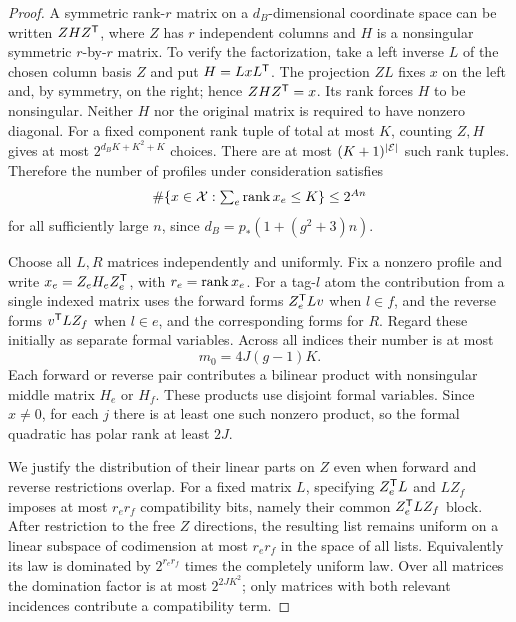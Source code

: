 \begin{proof}
A symmetric rank-$r$ matrix on a $d_B$-dimensional coordinate
space can be written $ZHZ^{\mathsf T}$, where $Z$ has $r$ independent
columns and $H$ is a nonsingular symmetric $r$-by-$r$ matrix.
To verify the factorization, take a left inverse $L$ of the
chosen column basis $Z$ and put $H=LxL^{\mathsf T}$.  The projection
$ZL$ fixes $x$ on the left and, by symmetry, on the right;
hence $ZHZ^{\mathsf T}=x$.  Its rank forces $H$ to be nonsingular.
Neither $H$ nor the original matrix is required to have nonzero
diagonal.  For a fixed component rank tuple of total at most
$K$, counting $Z,H$ gives at most $2^{d_BK+K^2+K}$ choices.
There are at most $(K+1)^{|\mathcal E|}$ such rank tuples.  Therefore
the number of profiles under consideration satisfies
\begin{equation}\label{eq:low-rank-profile-count}
 \#\{x\in\mathcal X:\textstyle\sum_e\operatorname{rank} x_e\le K\}\le2^{An}
\end{equation}
for all sufficiently large $n$, since
$d_B=p_*(1+(g^2+3)n)$.

Choose all $L,R$ matrices independently and uniformly.  Fix a
nonzero profile and write $x_e=Z_eH_eZ_e^{\mathsf T}$, with
$r_e=\operatorname{rank} x_e$.  For a tag-$l$ atom the contribution from a
single indexed matrix uses the forward forms $Z_e^{\mathsf T} L v$
when $l\in f$, and the reverse forms $v^{\mathsf T} L Z_f$ when
$l\in e$, and the corresponding forms for $R$.
Regard these initially as separate formal variables.  Across
all indices their number is at most
\[
 m_0=4J(g-1)K.
\]
Each forward or reverse pair contributes a bilinear product
with nonsingular middle matrix $H_e$ or $H_f$.  These products
use disjoint formal variables.  Since $x\ne0$, for each $j$
there is at least one such nonzero product, so the formal
quadratic has polar rank at least $2J$.

We justify the distribution of their linear parts on $Z$ even
when forward and reverse restrictions overlap.  For a fixed
matrix $L$, specifying $Z_e^{\mathsf T} L$ and $LZ_f$ imposes at
most $r_er_f$ compatibility bits, namely their common
$Z_e^{\mathsf T} LZ_f$ block.  After restriction to the free $Z$
directions, the resulting list remains uniform on a linear
subspace of codimension at most $r_er_f$ in the space of all
lists.  Equivalently its law is dominated by $2^{r_er_f}$ times
the completely uniform law.  Over all matrices the domination
factor is at most $2^{2JK^2}$; only matrices with both relevant
incidences contribute a compatibility term.


\end{proof}
